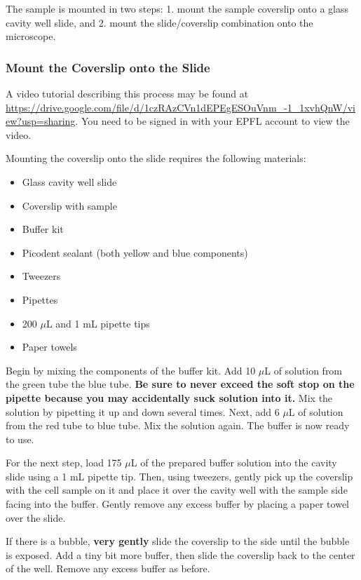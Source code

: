 \documentclass[10pt,a4paper,oneside]{book}
\begin{document}
The sample is mounted in two steps: 1. mount the sample coverslip onto a glass cavity well slide, and 2. mount the slide/coverslip combination onto the microscope.

\subsubsection{Mount the Coverslip onto the Slide}

\newline

A video tutorial describing this process may be found at \url{https://drive.google.com/file/d/1czRAzCVn1dEPEgESOuVnm_-1_1xvhQnW/view?usp=sharing}. You need to be signed in with your EPFL account to view the video.

Mounting the coverslip onto the slide requires the following materials:

\begin{itemize}
    \item{Glass cavity well slide}
    \item{Coverslip with sample}
    \item{Buffer kit}
    \item{Picodent sealant (both yellow and blue components)}
    \item{Tweezers}
    \item{Pipettes}
    \item{200 $\mu$L and 1 mL pipette tips}
    \item{Paper towels}
\end{itemize}

Begin by mixing the components of the buffer kit. Add 10 $\mu$L of solution from the green tube the blue tube. \textbf{Be sure to never exceed the soft stop on the pipette because you may accidentally suck solution into it.} Mix the solution by pipetting it up and down several times. Next, add 6 $\mu$L of solution from the red tube to blue tube. Mix the solution again. The buffer is now ready to use.

For the next step, load 175 $\mu$L of the prepared buffer solution into the cavity slide using a 1 mL pipette tip. Then, using tweezers, gently pick up the coverslip with the cell sample on it and place it over the cavity well with the sample side facing into the buffer. Gently remove any excess buffer by placing a paper towel over the slide.

If there is a bubble, \textbf{very gently} slide the coverslip to the side until the bubble is exposed. Add a tiny bit more buffer, then slide the coverslip back to the center of the well. Remove any excess buffer as before.
\end{document}
